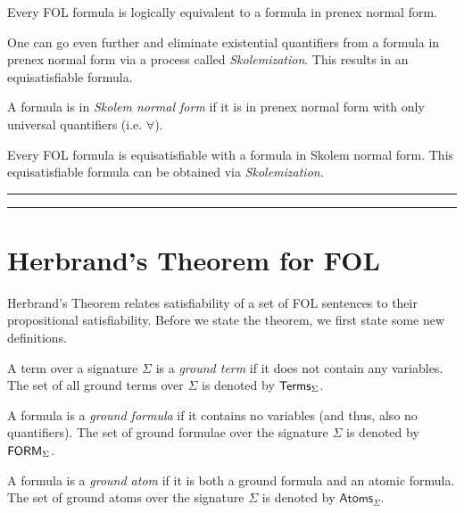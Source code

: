 \documentclass[11pt,usenames, dvipsnames]{article}
\begin{document}
\begin{claim}
  Every FOL formula is logically equivalent to a formula in prenex normal form.
\end{claim}

One can go even further and eliminate existential quantifiers from a formula in prenex normal form via a process called \emph{Skolemization}. This results in an equisatisfiable formula.

\begin{definition}
  A formula is in \emph{Skolem normal form} if it is in prenex normal form with only universal quantifiers (i.e. $\forall$).
\end{definition}

\begin{claim}[Skolemization]
  Every FOL formula is equisatisfiable with a formula in Skolem normal form. This equisatisfiable formula can be obtained via \emph{Skolemization}.
\end{claim}

\vspace{5truemm}
\hrule
\hrule

\section*{\large \centering Herbrand's Theorem for FOL}
\noindent

Herbrand's Theorem relates satisfiability of a set of FOL sentences to their propositional satisfiability. Before we state the theorem, we first state some new definitions.

\begin{definition}
  A term over a signature $\Sigma$ is a \emph{ground term} if it does not contain any variables. The set of all ground terms over $\Sigma$ is denoted by $\mathsf{Terms}_{\Sigma}$.
\end{definition}

\begin{definition}  
  A formula is a \emph{ground formula} if it contains no variables (and thus, also no quantifiers). The set of ground formulae over the signature $\Sigma$ is denoted by $\mathsf{FORM}_{\Sigma}$.
\end{definition}
  
\begin{definition}
  A formula is a \emph{ground atom} if it is both a ground formula and an atomic formula. The set of ground atoms over the signature $\Sigma$ is denoted by $\mathsf{Atoms}_{\Sigma}$.
\end{definition}
\end{document}
